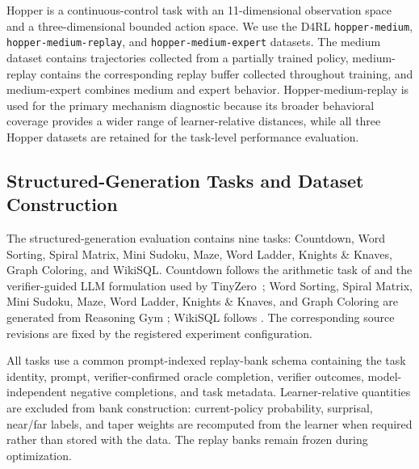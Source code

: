 \documentclass{article}
\theoremstyle{plain}
\theoremstyle{definition}
\theoremstyle{remark}
\begin{document}
Hopper is a continuous-control task with an
11-dimensional observation space and a three-dimensional bounded action
space. We use the D4RL
\texttt{hopper-medium},
\texttt{hopper-medium-replay}, and
\texttt{hopper-medium-expert}
datasets. The medium dataset contains trajectories collected from a
partially trained policy, medium-replay contains the corresponding replay
buffer collected throughout training, and medium-expert combines medium
and expert behavior. Hopper-medium-replay is used for the primary mechanism
diagnostic because its broader behavioral coverage provides a wider range of
learner-relative distances, while all three Hopper datasets are retained for
the task-level performance evaluation.

\subsection{Structured-Generation Tasks and Dataset Construction}
\label{app:structured_generation_dataset}

The structured-generation evaluation contains nine tasks:
Countdown, Word Sorting, Spiral Matrix, Mini Sudoku, Maze, Word Ladder,
Knights \& Knaves, Graph Coloring, and WikiSQL. Countdown follows the
arithmetic task of \citet{hutton2002countdown} and the verifier-guided
LLM formulation used by TinyZero~\citep{pan2025tinyzero}; Word Sorting,
Spiral Matrix, Mini Sudoku, Maze, Word Ladder, Knights \& Knaves, and
Graph Coloring are generated from Reasoning Gym
\citep{stojanovski2025reasoninggym}; WikiSQL follows
\citet{zhong2017seq2sql}. The corresponding source revisions are fixed by
the registered experiment configuration.

All tasks use a common prompt-indexed replay-bank schema containing the
task identity, prompt, verifier-confirmed oracle completion, verifier
outcomes, model-independent negative completions, and task metadata.
Learner-relative quantities are excluded from bank construction:
current-policy probability, surprisal, near/far labels, and taper weights
are recomputed from the learner when required rather than stored with the
data. The replay banks remain frozen during optimization.
\end{document}
